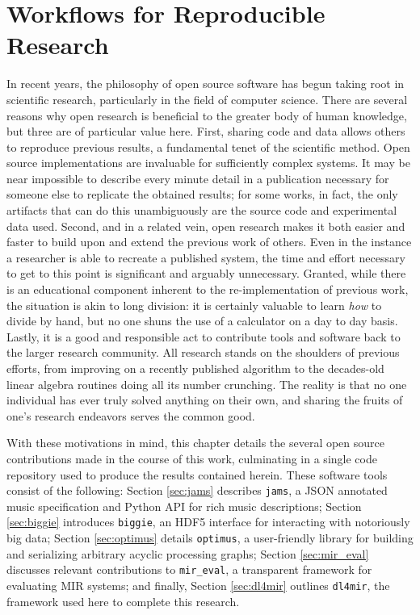 

\graphicspath{{7/figures/}}

\chapter{Workflows for Reproducible Research}
\label{chp:reproducibility}

In recent years, the philosophy of open source software has begun taking root in scientific research, particularly in the field of computer science.
There are several reasons why open research is beneficial to the greater body of human knowledge, but three are of particular value here.
First, sharing code and data allows others to reproduce previous results, a fundamental tenet of the scientific method.
Open source implementations are invaluable for sufficiently complex systems.
It may be near impossible to describe every minute detail in a publication necessary for someone else to replicate the obtained results;
for some works, in fact, the only artifacts that can do this unambiguously are the source code and experimental data used.
Second, and in a related vein, open research makes it both easier and faster to build upon and extend the previous work of others.
Even in the instance a researcher is able to recreate a published system, the time and effort necessary to get to this point is significant and arguably unnecessary.
Granted, while there is an educational component inherent to the re-implementation of previous work, the situation is akin to long division:
it is certainly valuable to learn \emph{how} to divide by hand, but no one shuns the use of a calculator on a day to day basis.
Lastly, it is a good and responsible act to contribute tools and software back to the larger research community.
All research stands on the shoulders of previous efforts, from improving on a recently published algorithm to the decades-old linear algebra routines doing all its number crunching.
The reality is that no one individual has ever truly solved anything on their own, and sharing the fruits of one's research endeavors serves the common good.

With these motivations in mind, this chapter details the several open source contributions made in the course of this work, culminating in a single code repository used to produce the results contained herein.
These software tools consist of the following:
Section \ref{sec:jams} describes \texttt{jams}, a JSON annotated music specification and Python API for rich music descriptions;
Section \ref{sec:biggie} introduces \texttt{biggie}, an HDF5 interface for interacting with notoriously big data;
Section \ref{sec:optimus} details \texttt{optimus}, a user-friendly library for building and serializing arbitrary acyclic processing graphs;
Section \ref{sec:mir_eval} discusses relevant contributions to \texttt{mir\_eval}, a transparent framework for evaluating MIR systems;
and finally, Section \ref{sec:dl4mir} outlines \texttt{dl4mir}, the framework used here to complete this research.


